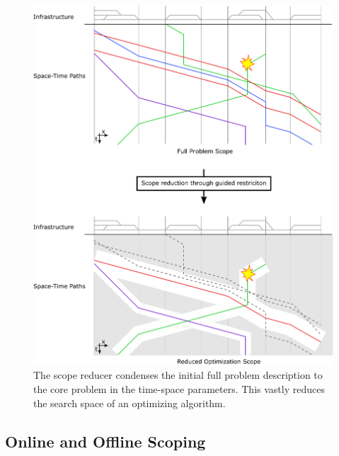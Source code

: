 \documentclass{article}
\begin{document}
%
\begin{figure}[hbtp]
	\centering
  \includegraphics[width=\textwidth]{Figures/rsp_rescheduling_rsp.pdf}
	\caption{The scope reducer condenses the initial full problem description to the core problem in the time-space parameters. This vastly reduces the search space of an optimizing algorithm.}
	\label{fig:introduction_time_space}
\end{figure}

\subsection{Online and Offline Scoping}\label{subec:online_offline}
\end{document}
